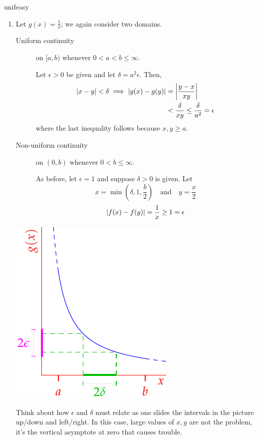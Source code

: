 \begin{examples}{}{unifeasy}
\begin{enumerate}
	\item Let $g(x)=\frac 1x$; we again consider two domains.\par
	\begin{minipage}[t]{0.65\linewidth}\vspace{-8pt}
	\begin{description}
		\item[Uniform continuity] on $[a,b)$ whenever $0<a<b\le \infty$.\par
		Let $\epsilon>0$ be given and let $\delta=a^2\epsilon$. Then,
		\begin{align*}
			\left| x-y\right|<\delta \implies \left| g(x)-g(y)\right|&=\left| \frac{y-x}{xy}\right|\\
			&<\frac\delta{xy}\le\frac{\delta}{a^2}=\epsilon
		\end{align*}
		where the last inequality follows because $x,y\ge a$.
		\item[Non-uniform continuity] on $(0,b)$ whenever $0<b\le\infty$.\par
		As before, let $\epsilon=1$ and suppose $\delta>0$ is given. 
		Let
		\[x=\min\left(\delta,1,\frac b2\right) \quad\text{and}\quad y=\frac x2\]
		\[\left| f(x)-f(y)\right|=\frac 1x\ge 1=\epsilon\]
	\end{description}
	\end{minipage}
	\hfill
	\begin{minipage}[t]{0.34\linewidth}\vspace{0pt}
		\flushright\includegraphics{unifcont2}
	\end{minipage}\bigbreak
Think about how $\epsilon$ and $\delta$ must relate as one slides the intervals in the picture up/down and left/right. In this case, large values of $x,y$ are not the problem, it's the vertical asymptote at zero that causes trouble. 
	
\end{enumerate}
\end{examples}


